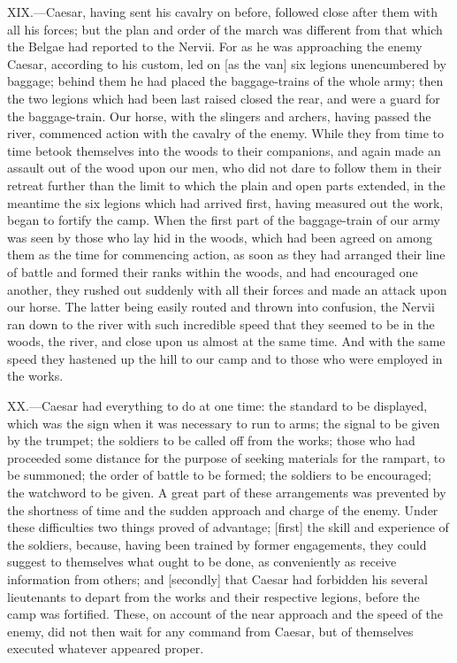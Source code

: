 XIX.—Caesar, having sent his cavalry on before, followed close after
them with all his forces; but the plan and order of the march was
different from that which the Belgae had reported to the Nervii. For as
he was approaching the enemy Caesar, according to his custom, led on [as
the van] six legions unencumbered by baggage; behind them he had placed
the baggage-trains of the whole army; then the two legions which had
been last raised closed the rear, and were a guard for the baggage-train.
Our horse, with the slingers and archers, having passed the river,
commenced action with the cavalry of the enemy. While they from
time to time betook themselves into the woods to their companions, and
again made an assault out of the wood upon our men, who did not dare to
follow them in their retreat further than the limit to which the plain
and open parts extended, in the meantime the six legions which had
arrived first, having measured out the work, began to fortify the camp.
When the first part of the baggage-train of our army was seen by those
who lay hid in the woods, which had been agreed on among them as the
time for commencing action, as soon as they had arranged their line of
battle and formed their ranks within the woods, and had encouraged one
another, they rushed out suddenly with all their forces and made an
attack upon our horse. The latter being easily routed and thrown into
confusion, the Nervii ran down to the river with such incredible speed
that they seemed to be in the woods, the river, and close upon us almost
at the same time. And with the same speed they hastened up the hill to
our camp and to those who were employed in the works.

XX.—Caesar had everything to do at one time: the standard to be
displayed, which was the sign when it was necessary to run to arms; the
signal to be given by the trumpet; the soldiers to be called off from
the works; those who had proceeded some distance for the purpose of
seeking materials for the rampart, to be summoned; the order of battle
to be formed; the soldiers to be encouraged; the watchword to be given.
A great part of these arrangements was prevented by the shortness of
time and the sudden approach and charge of the enemy. Under these
difficulties two things proved of advantage; [first] the skill and
experience of the soldiers, because, having been trained by former
engagements, they could suggest to themselves what ought to be done, as
conveniently as receive information from others; and [secondly] that
Caesar had forbidden his several lieutenants to depart from the works
and their respective legions, before the camp was fortified. These, on
account of the near approach and the speed of the enemy, did not then
wait for any command from Caesar, but of themselves executed whatever
appeared proper.

